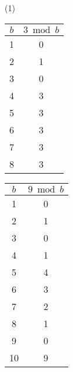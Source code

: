 \vfill
\noindent
(1)
\begin{minipage}{0.32\textwidth}
    \centering
    \begin{tabular}{c|c}
        \rowcolor{OliveGreen!10}$b$ & $3 \bmod b$ \\
        \hline
        1                           & 0           \\
        2                           & 1           \\
        3                           & 0           \\
        4                           & 3           \\
        5                           & 3           \\
        6                           & 3           \\
        7                           & 3           \\
        8                           & 3           \\
    \end{tabular}
\end{minipage}%
\begin{minipage}{0.32\textwidth}
    \centering
    \begin{tabular}{c|c}
        \rowcolor{OliveGreen!10}$b$ & $9 \bmod b$ \\
        \hline
        1                           & 0           \\
        2                           & 1           \\
        3                           & 0           \\
        4                           & 1           \\
        5                           & 4           \\
        6                           & 3           \\
        7                           & 2           \\
        8                           & 1           \\
        9                           & 0           \\
        10                          & 9           \\
    \end{tabular}
\end{minipage}%
